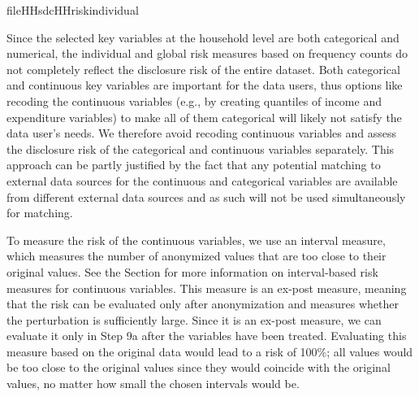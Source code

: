\documentclass[letterpaper,10pt,english]{sphinxmanual}
\begin{document}
\def\sphinxLiteralBlockLabel{\label{\detokenize{casestudies:code913}}}
%
\begin{sphinxVerbatim}[commandchars=\\\{\},numbers=left,firstnumber=1,stepnumber=1]
fileHH\PYG{p}{[}sdcHHriskindividual\PYG{p}{[} \PYG{p}{]}  \PYG{p}{]}
\end{sphinxVerbatim}

Since the selected key variables at the household level are both
categorical and numerical, the individual and global risk measures based
on frequency counts do not completely reflect the disclosure risk of the
entire dataset. Both categorical and continuous key variables are
important for the data users, thus options like recoding the continuous
variables (e.g., by creating quantiles of income and expenditure
variables) to make all of them categorical will likely not satisfy the
data user’s needs. We therefore avoid recoding continuous variables and
assess the disclosure risk of the categorical and continuous variables
separately. This approach can be partly justified by the fact that any
potential matching to external data sources for the continuous and
categorical variables are available from different external data sources
and as such will not be used simultaneously for matching.


To measure the risk of the continuous variables, we use an interval
measure, which measures the number of anonymized values that are too
close to their original values. See the Section 
for more information
on interval-based risk measures for continuous variables. This measure
is an ex-post measure, meaning that the risk can be evaluated only after
anonymization and measures whether the perturbation is sufficiently
large. Since it is an ex-post measure, we can evaluate it only in Step
9a after the variables have been treated. Evaluating this measure based
on the original data would lead to a risk of 100\%; all values would be
too close to the original values since they would coincide with the
original values, no matter how small the chosen intervals would be.
\end{document}
